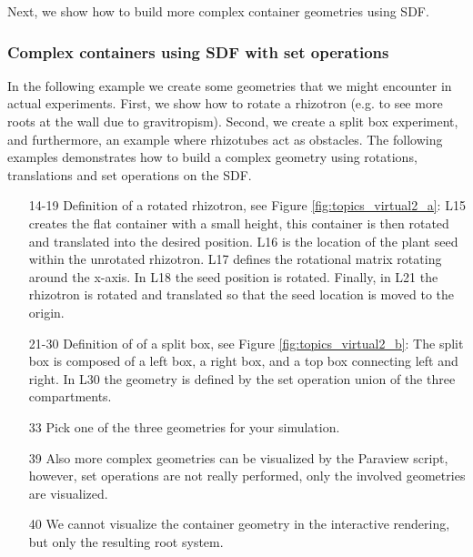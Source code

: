Next, we show how to build more complex container geometries using SDF. 


\subsubsection*{Complex containers using SDF with set operations}

In the following example we create some geometries that we might encounter in actual experiments. First, we show how to rotate a rhizotron (e.g. to see more roots at the wall due to gravitropism). Second, we create a split box experiment, and furthermore, an example where rhizotubes act as obstacles. The following examples demonstrates how to build a complex geometry using rotations, translations and set operations on the SDF.



\begin{itemize}
\item[14-19] Definition of a rotated rhizotron, see Figure \ref{fig:topics_virtual2_a}: 
L15 creates the flat container with a small height, this container is then rotated and translated into the desired position. L16 is the location of the plant seed within the unrotated rhizotron. L17 defines the rotational matrix rotating around the x-axis. In L18 the seed position is rotated. Finally, in L21 the rhizotron is rotated and translated so that the seed location is moved to the origin. 
\item[21-30] Definition of of a split box, see Figure \ref{fig:topics_virtual2_b}: 
The split box is composed of a left box, a right box, and a top box connecting left and right. 
In L30 the geometry is defined by the set operation union of the three compartments. 
\item[33] Pick one of the three geometries for your simulation.
\item[39] Also more complex geometries can be visualized by the Paraview script, 
however, set operations are not really performed, only the involved geometries are visualized.
\item[40] We cannot visualize the container geometry in the interactive rendering, but only the resulting root system. 
\end{itemize}

